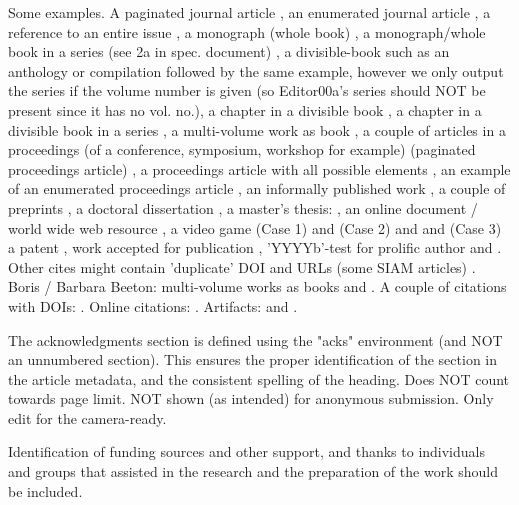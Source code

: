 \documentclass[sigconf,anonymous,review]{acmart}
\begin{document}
Some examples.  A paginated journal article \cite{Abril07}, an enumerated
journal article \cite{Cohen07}, a reference to an entire issue \cite{JCohen96},
a monograph (whole book) \cite{Kosiur01}, a monograph/whole book in a series
(see 2a in spec. document) \cite{Harel79}, a divisible-book such as an anthology
or compilation \cite{Editor00} followed by the same example, however we only
output the series if the volume number is given \cite{Editor00a} (so Editor00a's
series should NOT be present since it has no vol. no.), a chapter in a divisible
book \cite{Spector90}, a chapter in a divisible book in a series
\cite{Douglass98}, a multi-volume work as book \cite{Knuth97}, a couple of
articles in a proceedings (of a conference, symposium, workshop for example)
(paginated proceedings article) \cite{Andler79, Hagerup1993}, a proceedings
article with all possible elements \cite{Smith10}, an example of an enumerated
proceedings article \cite{VanGundy07}, an informally published work
\cite{Harel78}, a couple of preprints \cite{Bornmann2019, AnzarootPBM14}, a
doctoral dissertation \cite{Clarkson85}, a master's thesis: \cite{anisi03}, an
online document / world wide web resource \cite{Thornburg01, Ablamowicz07,
Poker06}, a video game (Case 1) \cite{Obama08} and (Case 2) \cite{Novak03} and
\cite{Lee05} and (Case 3) a patent \cite{JoeScientist001}, work accepted for
publication \cite{rous08}, 'YYYYb'-test for prolific author \cite{SaeediMEJ10}
and \cite{SaeediJETC10}. Other cites might contain 'duplicate' DOI and URLs
(some SIAM articles) \cite{Kirschmer:2010:AEI:1958016.1958018}. Boris / Barbara
Beeton: multi-volume works as books \cite{MR781536} and \cite{MR781537}. A
couple of citations with DOIs:
\cite{2004:ITE:1009386.1010128,Kirschmer:2010:AEI:1958016.1958018}. Online
citations: \cite{TUGInstmem, Thornburg01, CTANacmart}. Artifacts: \cite{R} and
\cite{UMassCitations}.


\appendix

\begin{acks}
The acknowledgments section is defined using the "acks" environment (and NOT an
unnumbered section). This ensures the proper identification of the section in
the article metadata, and the consistent spelling of the heading. Does NOT count
towards page limit. NOT shown (as intended) for anonymous submission. Only edit
for the camera-ready.

Identification of funding sources and other support, and thanks to individuals
and groups that assisted in the research and the preparation of the work should
be included.
\end{acks}
\end{document}
